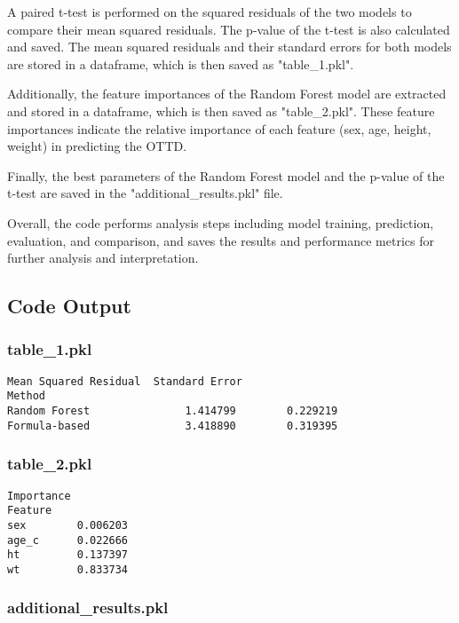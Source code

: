 \documentclass[11pt]{article}
\begin{document}
A paired t-test is performed on the squared residuals of the two models to compare their mean squared residuals. The p-value of the t-test is also calculated and saved. The mean squared residuals and their standard errors for both models are stored in a dataframe, which is then saved as "table\_1.pkl".

Additionally, the feature importances of the Random Forest model are extracted and stored in a dataframe, which is then saved as "table\_2.pkl". These feature importances indicate the relative importance of each feature (sex, age, height, weight) in predicting the OTTD.

Finally, the best parameters of the Random Forest model and the p-value of the t-test are saved in the "additional\_results.pkl" file.

Overall, the code performs analysis steps including model training, prediction, evaluation, and comparison, and saves the results and performance metrics for further analysis and interpretation.

\subsection{Code Output}

\subsubsection*{table\_1.pkl}

\begin{Verbatim}[tabsize=4]
               Mean Squared Residual  Standard Error
Method
Random Forest               1.414799        0.229219
Formula-based               3.418890        0.319395
\end{Verbatim}

\subsubsection*{table\_2.pkl}

\begin{Verbatim}[tabsize=4]
         Importance
Feature
sex        0.006203
age_c      0.022666
ht         0.137397
wt         0.833734
\end{Verbatim}

\subsubsection*{additional\_results.pkl}
\end{document}
